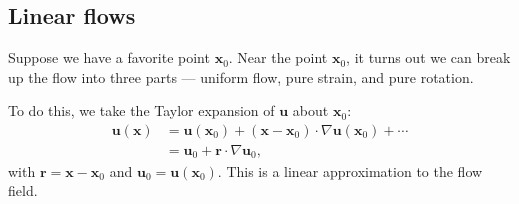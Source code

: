 \documentclass[a4paper]{article}
\begin{document}
\subsection{Linear flows}
Suppose we have a favorite point $\mathbf{x}_0$. Near the point $\mathbf{x}_0$, it turns out we can break up the flow into three parts --- uniform flow, pure strain, and pure rotation.

To do this, we take the Taylor expansion of $\mathbf{u}$ about $\mathbf{x}_0$:
\begin{align*}
  \mathbf{u}(\mathbf{x}) &= \mathbf{u}(\mathbf{x}_0) + (\mathbf{x} - \mathbf{x}_0) \cdot \nabla \mathbf{u}(\mathbf{x}_0) + \cdots\\
  &= \mathbf{u}_0 + \mathbf{r}\cdot \nabla \mathbf{u}_0,
\end{align*}
with $\mathbf{r} = \mathbf{x} - \mathbf{x}_0$ and $\mathbf{u}_0 = \mathbf{u}(\mathbf{x}_0)$. This is a linear approximation to the flow field.
\end{document}
